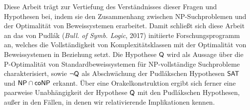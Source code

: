 Diese Arbeit trägt zur Vertiefung des Verständnisses dieser Fragen und Hypothesen bei, indem sie den Zusammenhang zwischen NP-Suchproblemen und der Optimalität von Beweissystemen erarbeitet. Damit schließt sich diese Arbeit an das von Pudlák (\emph{Bull. of Symb. Logic}, 2017) initiierte Forschungsprogramm an, welches die Vollständigkeit von Komplexitätsklassen mit der Optimalität von Beweissystemen in Beziehung setzt. Die Hypothese $\mathsf{Q}$ wird als Aussage über die P-Optimalität von Standardbeweissystemen für NP-vollständige Suchprobleme charakterisiert, sowie $\neg\mathsf{Q}$ als Abschwächung der Pudlákschen Hypothesen $\mathsf{SAT}$ und $\mathsf{NP}{}\cap{}\mathsf{coNP}$ erkannt.
Über eine Orakelkonstruktion ergibt sich ferner eine paarweise Unabhängigkeit der Hypothese $\mathsf{Q}$ mit den Pudlákschen Hypothesen, außer in den Fällen, in denen wir relativierende Implikationen kennen.
\cleardoublepage

\tableofcontents
\thispagestyle{empty}
\cleardoublepage
{}
\pagestyle{main}

